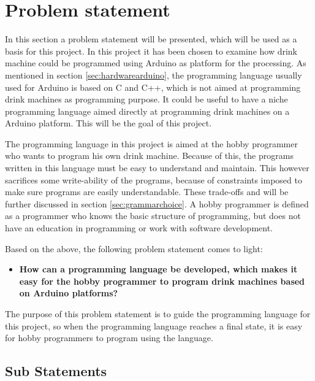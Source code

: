\section{Problem statement}
\label{sec:problemstatement}
In this section a problem statement will be presented, which will be used as a basis for this project. In this project it has been chosen to examine how drink machine could be programmed using Arduino as platform for the processing. As mentioned in section \ref{sec:hardwarearduino}, the programming language usually used for Arduino is based on C and C++, which is not aimed at programming drink machines as programming purpose. It could be useful to have a niche programming language aimed directly at programming drink machines on a Arduino platform. This will be the goal of this project.

The programming language in this project is aimed at the hobby programmer who wants to program his own drink machine. Because of this, the programs written in this language must be easy to understand and maintain. This however sacrifices some write-ability of the programs, because of constraints imposed to make sure programs are easily understandable. These trade-offs and will be further discussed in section \ref{sec:grammarchoice}. A hobby programmer is defined as a programmer who knows the basic structure of programming, but does not have an education in programming or work with software development.

Based on the above, the following problem statement comes to light:
\begin{itemize}
	\item \textbf{How can a programming language be developed, which makes it easy for the hobby programmer to program drink machines based on Arduino platforms?}
\end{itemize}
The purpose of this problem statement is to guide the programming language for this project, so when the programming language reaches a final state, it is easy for hobby programmers to program using the language. 

\subsection{Sub Statements}

